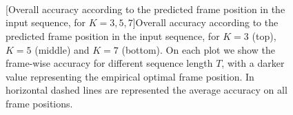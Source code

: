 \begin{figure}[t]
    \centering
    \\
    
    \\
    
    \\

    [Overall accuracy according to the predicted frame position in the input sequence, for $K=3,5,7$]{Overall accuracy according to the predicted frame position in the input sequence, for $K=3$ (top), $K=5$ (middle) and $K=7$ (bottom). On each plot we show the frame-wise accuracy for different sequence length $T$, with a darker value representing the empirical optimal frame position. In horizontal dashed lines are represented the average accuracy on all frame positions.}
    \label{fig:accuracyPerFrame}
\end{figure}

